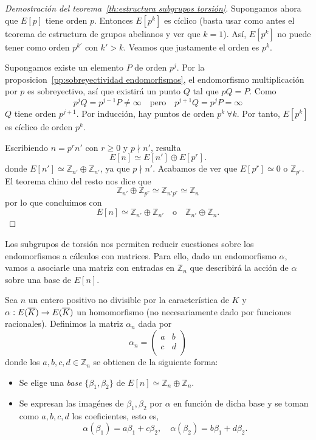 \begin{proof}[Demostración del teorema~\ref{th:estructura subgrupos torsión}]
Supongamos ahora que $E[p]$ tiene orden $p$. Entonces $E[p^k]$ es cíclico (basta usar como antes el teorema de estructura de grupos abelianos y ver que $k = 1$). Así, $E[p^k]$ no puede tener como orden $p^{k'}$ con $k' > k$. Veamos que justamente el orden es $p^k$.

Supongamos existe un elemento $P$ de orden $p^j$. Por la proposicion~\ref{pp:sobreyectividad endomorfismos}, el endomorfismo multiplicación por $p$ es sobreyectivo, así que existirá un punto $Q$ tal que $p Q = P$. Como
$$
	p^j Q = p^{j-1} P \neq \infty \quad \textrm{pero} \quad p^{j+1} Q = p^j P = \infty
$$
$Q$ tiene orden $p^{j+1}$. Por inducción, hay puntos de orden $p^k \ \forall k$. Por tanto, $E[p^k]$ es cíclico de orden $p^k$.

Escribiendo $n = p^r n'$ con $r \geq 0$ y $p \nmid n'$, resulta
$$
	E[n] \simeq E[n'] \oplus E[p^r].
$$
donde $E[n'] \simeq \mathbb{Z}_{n'} \oplus \mathbb{Z}_{n'}$, ya que $p \nmid n'$. Acabamos de ver que $E[p^r] \simeq 0$ o $\mathbb{Z}_{p^r}$. El teorema chino del resto nos dice que
$$
	\mathbb{Z}_{n'} \oplus \mathbb{Z}_{p^r} \simeq \mathbb{Z}_{n' p^r} \simeq \mathbb{Z}_{n}
$$
por lo que concluimos con
$$
	E[n] \simeq \mathbb{Z}_{n'} \oplus \mathbb{Z}_{n'} \quad \textrm{o} \quad  \mathbb{Z}_{n'} \oplus \mathbb{Z}_{n}.
$$
\end{proof}

Los subgrupos de torsión nos permiten reducir cuestiones sobre los endomorfismos a cálculos con matrices. Para ello, dado un endomorfismo $\alpha$, vamos a asociarle una matriz con entradas en $\mathbb{Z}_{n}$ que describirá la acción de $\alpha$ sobre una base de $E[n]$.

\begin{definicion}\label{def: matriz endomorfismo}
	Sea $n$ un entero positivo no divisible por la característica de $K$ y $\alpha: E(\overline{K}) \to E(\overline{K})$ un homomorfismo (no necesariamente dado por funciones racionales). Definimos la matriz $\alpha_n$ dada por
	$$
	\alpha_n =
	\begin{pmatrix}
		a & b \\
		c & d \\
	\end{pmatrix}
	$$
	donde los $a, b, c, d \in \mathbb{Z}_{n}$ se obtienen de la siguiente forma:
	\begin{itemize}
		\item Se elige una \emph{base} $\{ \beta_1, \beta_2 \}$ de $E[n] \simeq  \mathbb{Z}_{n} \oplus  \mathbb{Z}_{n}$.
		\item Se expresan las imagénes de $\beta_1, \beta_2$ por $\alpha$ en función de dicha base y se toman como $a, b, c, d$ los coeficientes, esto es,
		$$
			\alpha(\beta_1) = a \beta_1 + c \beta_2, \quad
			\alpha(\beta_2) = b \beta_1 + d \beta_2.
		$$
	\end{itemize}
\end{definicion}

